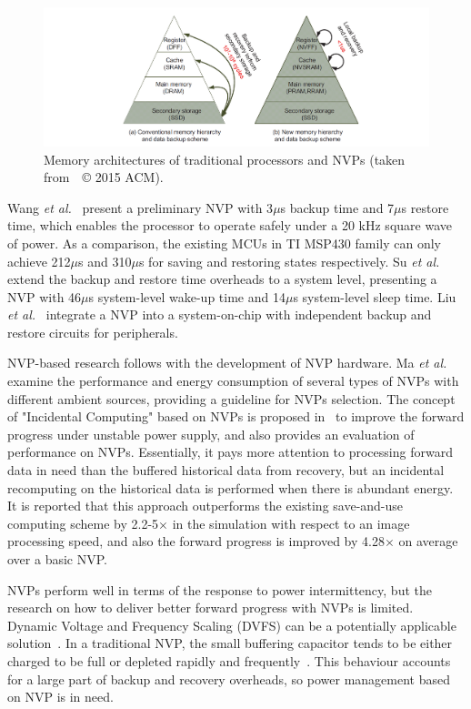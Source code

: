 \begin{figure}
    \centering
    \includegraphics[width=\columnwidth]{ch2_review/figures/nvp}
    \caption{Memory architectures of traditional processors and NVPs (taken from~\cite{liu2015ambient}~© 2015 ACM).}
    \label{Figure:nvp}
\end{figure}

Wang \textit{et al.}~\cite{wang20123us} present a preliminary NVP with 3$\mu$s backup time and 7$\mu$s restore time, which enables the processor to operate safely under a 20 kHz square wave of power. 
As a comparison, the existing MCUs in TI MSP430 family can only achieve 212$\mu$s and 310$\mu$s for saving and restoring states respectively. 
Su \textit{et al.}~\cite{su2017ferroelectric} extend the backup and restore time overheads to a system level, presenting a NVP with 46$\mu$s system-level wake-up time and 14$\mu$s system-level sleep time. 
Liu \textit{et al.}~\cite{liu2019130} integrate a NVP into a system-on-chip with independent backup and restore circuits for peripherals. 

NVP-based research follows with the development of NVP hardware. 
Ma \textit{et al.}~\cite{ma2015architecture} examine the performance and energy consumption of several types of NVPs with different ambient sources, providing a guideline for NVPs selection. 
The concept of "Incidental Computing" based on NVPs is proposed in~\cite{ma2017incidental} to improve the forward progress under unstable power supply, and also provides an evaluation of performance on NVPs. 
Essentially, it pays more attention to processing forward data in need than the buffered historical data from recovery, but an incidental recomputing on the historical data is performed when there is abundant energy. 
It is reported that this approach outperforms the existing save-and-use computing scheme by 2.2-5$\times$ in the simulation with respect to an image processing speed, and also the forward progress is improved by 4.28$\times$ on average over a basic NVP.

NVPs perform well in terms of the response to power intermittency, but the research on how to deliver better forward progress with NVPs is limited. 
Dynamic Voltage and Frequency Scaling (DVFS) can be a potentially applicable solution~\cite{ma2016nonvolatile}. 
In a traditional NVP, the small buffering capacitor tends to be either charged to be full or depleted rapidly and frequently~\cite{su2017nonvolatile}. 
This behaviour accounts for a large part of backup and recovery overheads, so power management based on NVP is in need.

